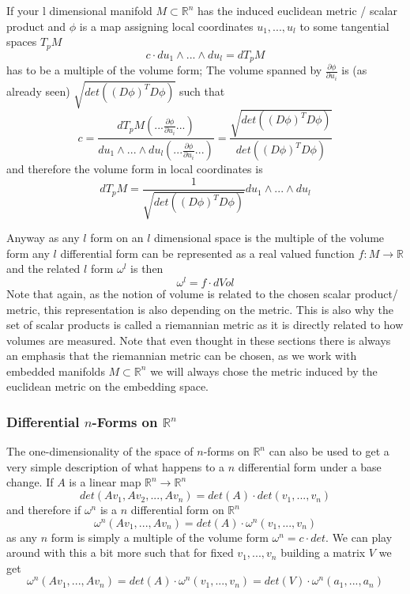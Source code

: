 If your l dimensional manifold $M\subset \mathbb R^n$ has the induced  euclidean metric / scalar product and $\phi$ is a map assigning local coordinates $u_1,...,u_l$ to some tangential spaces $T_pM$
\[c \cdot du_1\wedge...\wedge du_l = dT_pM\]
has to be a multiple of the volume form; The volume spanned by $\frac{\partial \phi}{\partial u_i}$ is (as already seen) $\sqrt{det((D\phi)^TD\phi)}$ such that
\[c = \frac{dT_pM(...\frac{\partial \phi}{\partial u_i}...)}{du_1\wedge...\wedge du_l (...\frac{\partial \phi}{\partial u_i}...)} = \frac{\sqrt{det((D\phi)^TD\phi)}}{det((D\phi)^TD\phi)}\]
and therefore the volume form in local coordinates is
\[dT_pM =\frac{1}{\sqrt{det((D\phi)^TD\phi)}}  du_1\wedge...\wedge du_l\]

Anyway as any $l$ form on an $l$ dimensional space is the multiple of the volume form any $l$ differential form can be represented as a real valued function $f:M \rightarrow \mathbb R$ and the related $l$ form $\omega^l$ is then
\[\omega^l = f \cdot dVol\]
Note that again, as the notion of volume is related to the chosen scalar product/ metric, this representation is also depending on the metric. This is also why the set of scalar products is called a riemannian metric as it is directly related to how volumes are measured. Note that even thought  in these sections there is always an emphasis that the riemannian metric can be chosen, as we work with embedded manifolds $M \subset \mathbb R^n$ we will always chose the metric induced by the euclidean metric on the embedding space. 

\subsubsection{Differential $n$-Forms on $\mathbb R^n$}
The one-dimensionality of the space of $n$-forms on $\mathbb R^n$ can also be used to get a very simple description of what happens to a $n$ differential form under a base change.
If $A$ is a linear map $\mathbb R^n \to \mathbb R^n$ 
\[det(Av_1,Av_2,...,Av_n) = det(A)\cdot det(v_1,...,v_n)\]
and therefore if $\omega^n$ is a $n$ differential form on $\mathbb R^n$
\[\omega^n(Av_1,...,Av_n) = det(A)\cdot \omega^n(v_1,...,v_n)\]
as any $n$ form is simply a multiple of the volume form $\omega^n = c \cdot det$. We can play around with this a bit more such that for fixed $v_1,...,v_n$ building a matrix $V$ we get
\[\omega^n(Av_1,...,Av_n) = det(A)\cdot \omega^n(v_1,...,v_n)= det(V) \cdot \omega^n(a_1,...,a_n)\]

